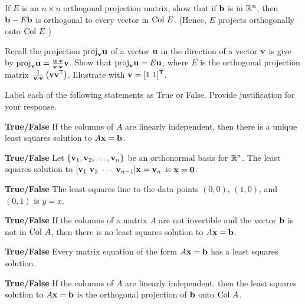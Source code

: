 \item If $E$ is an $n \times n$ orthogonal projection matrix, show that if $\mathbf{b}$ is in $\mathbb{R}^n$, then $\mathbf{b} - E\mathbf{b}$ is orthogonal to every vector in $\text{Col } E$. (Hence, $E$ projects orthogonally onto $\text{Col } E$.)
		
\item Recall the projection $\text{proj}_{\mathbf{v}} \mathbf{u}$ of a vector $\mathbf{u}$  in the direction of a vector $\mathbf{v}$ is give by $\text{proj}_{\mathbf{v}} \mathbf{u} = \frac{\mathbf{u} \cdot \mathbf{v}}{\mathbf{v} \cdot \mathbf{v}} \mathbf{v}$. Show that $\text{proj}_{\mathbf{v}} \mathbf{u} = E\mathbf{u}$, where $E$ is the orthogonal projection matrix $\frac{1}{\mathbf{v} \cdot \mathbf{v}} \left(\mathbf{v} \mathbf{v}^{\mathsf{T}} \right)$. Illustrate with $\vv = [1 \ 1]^{\tr}$. 

\ea

 \item Label each of the following statements as True or False. Provide justification for your response.
\ba	
\item \textbf{True/False} If the columns of $A$ are linearly independent, then there is a unique least squares solution to $A\mathbf{x} = \mathbf{b}$.

\item \textbf{True/False} Let $\{\mathbf{v}_1, \mathbf{v}_2, \ldots, \mathbf{v}_n\}$ be an orthonormal basis for $\mathbb{R}^n$. The least squares solution to $[\mathbf{v}_1 \ \mathbf{v}_2 \ \cdots \ \mathbf{v}_{n-1}] \mathbf{x} = \mathbf{v}_n$ is $\mathbf{x} = \mathbf{0}$.


\item \textbf{True/False} The least squares line to the data points $(0,0)$, $(1,0)$, and $(0,1)$ is $y=x$. 

\item \textbf{True/False} If the columns of a matrix $A$ are not invertible and the vector $\mathbf{b}$ is not in $\text{Col } A$, then there is no least squares solution to $A \mathbf{x} = \mathbf{b}$. 

\item \textbf{True/False} Every matrix equation of the form $A \mathbf{x} = \mathbf{b}$ has a least squares solution.

\item \textbf{True/False} If the columns of $A$ are linearly independent, then the least squares solution to $A \mathbf{x} = \mathbf{b}$ is the orthogonal projection of $\mathbf{b}$ onto $\text{Col } A$. 

\ea




\ee


\label{sec:proj_ls_approx}

